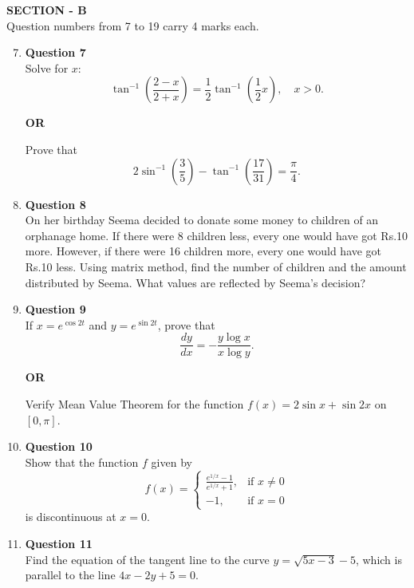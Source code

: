 \documentclass[12pt]{article}
\begin{document}
\begin{center}
\Large\textbf{SECTION - B}\\
\normalsize
Question numbers from 7 to 19 carry 4 marks each.
\end{center}

\begin{enumerate}
\setcounter{enumi}{6}

\item \textbf{Question 7} \\
Solve for $x$: 
\[
\tan^{-1} \left( \frac{2 - x}{2 + x} \right) = \frac{1}{2} \tan^{-1} \left( \frac{1}{2}x \right), \quad x > 0.
\]
\begin{center}
\textbf{OR} \\
\end{center}
Prove that
\[
2 \sin^{-1} \left( \frac{3}{5} \right) - \tan^{-1} \left( \frac{17}{31} \right) = \frac{\pi}{4}.
\]

\item \textbf{Question 8} \\
On her birthday Seema decided to donate some money to children of an orphanage home. If there were 8 children less, every one would have got  Rs.10 more. However, if there were 16 children more, every one would have got Rs.10 less. Using matrix method, find the number of children and the amount distributed by Seema. What values are reflected by Seema’s decision?

\item \textbf{Question 9} \\
If $x = e^{\cos 2t}$ and $y = e^{\sin 2t}$, prove that 
\[
\frac{dy}{dx} = -\frac{y \log x}{x \log y}.
\]
\begin{center}
\textbf{OR} \\
\end{center}
Verify Mean Value Theorem for the function $f(x) = 2 \sin x + \sin 2x$ on $[0, \pi]$.

\item \textbf{Question 10} \\
Show that the function $f$ given by
\[
f(x) =
\begin{cases}
\frac{e^{1/x}-1}{e^{1/x} + 1}, & \text{if } x \ne 0 \\
-1, & \text{if } x = 0
\end{cases}
\]
is discontinuous at $x = 0$.

\item \textbf{Question 11} \\
Find the equation of the tangent line to the curve $y = \sqrt{5x - 3} - 5$, which is parallel to the line $4x - 2y + 5 = 0$.


\end{enumerate}
\end{document}
